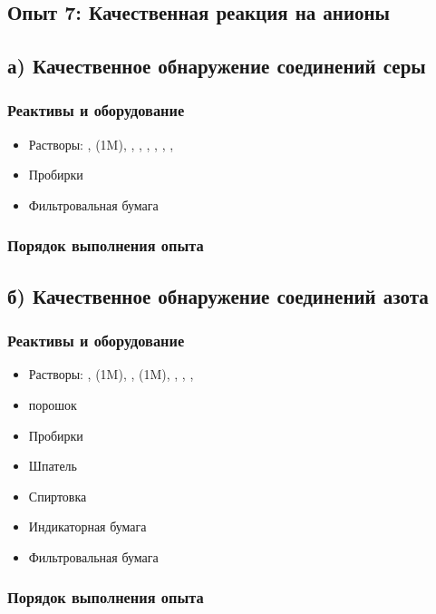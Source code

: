 \documentclass[a4paper, 12pt]{article}
\begin{document}
\subsection{Опыт 7: Качественная реакция на анионы}

\subsection*{а) Качественное обнаружение соединений серы}
\subsubsection{Реактивы и оборудование}

\begin{itemize}
	\item Растворы: ,  (1M), , , , , , , 
	
	\item Пробирки
	
	\item Фильтровальная бумага
\end{itemize}

\subsubsection{Порядок выполнения опыта}

\subsection*{б) Качественное обнаружение соединений азота}

\subsubsection{Реактивы и оборудование}

\begin{itemize}
	\item Растворы: ,  (1M), ,  (1M), , , , 
	
	\item {} порошок
	
	\item Пробирки
	
	\item Шпатель
	
	\item Спиртовка
	
	\item Индикаторная бумага
	
	\item Фильтровальная бумага
\end{itemize}

\subsubsection{Порядок выполнения опыта}
\end{document}
